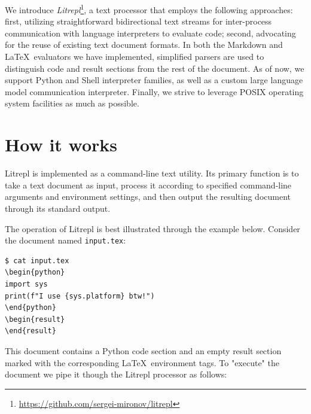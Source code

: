\documentclass[letterpaper,12pt,twocolumn]{article}
\newcommand{\Latex}{\LaTeX\ }
\begin{document}
We introduce
\textit{Litrepl}\footnote{\url{https://github.com/sergei-mironov/litrepl}},
a text processor that employs the following approaches: first, utilizing
straightforward bidirectional text streams for inter-process communication with
language interpreters to evaluate code; second, advocating for the reuse of
existing text document formats. In both the Markdown and \Latex evaluators we
have implemented, simplified parsers are used to distinguish code and result
sections from the rest of the document.  As of now, we support Python and Shell
interpreter families, as well as a custom large language model communication
interpreter. Finally, we strive to leverage POSIX\cite{POSIX2024} operating
system facilities as much as possible.

\section{How it works}

Litrepl is implemented as a command-line text utility. Its primary function is
to take a text document as input, process it according to specified command-line
arguments and environment settings, and then output the resulting document
through its standard output.

The operation of Litrepl is best illustrated through the example below. Consider
the document named \verb|input.tex|:

\begin{verbatim}
$ cat input.tex
\begin{python}
import sys
print(f"I use {sys.platform} btw!")
\end{python}
\begin{result}
\end{result}
\end{verbatim}

This document contains a Python code section and an empty result section marked
with the corresponding \Latex environment tags. To "execute" the document we
pipe it though the Litrepl processor as follows:
\end{document}
